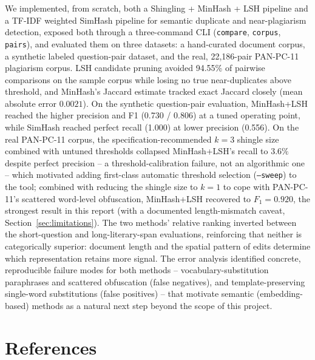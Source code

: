 \documentclass[11pt]{article}
\begin{document}
We implemented, from scratch, both a Shingling + MinHash + LSH pipeline and a TF-IDF weighted SimHash
pipeline for semantic duplicate and near-plagiarism detection, exposed both through a three-command CLI
(\texttt{compare}, \texttt{corpus}, \texttt{pairs}), and evaluated them on three datasets: a hand-curated
document corpus, a synthetic labeled question-pair dataset, and the real, 22{,}186-pair PAN-PC-11
plagiarism corpus. LSH candidate pruning avoided 94.55\% of pairwise comparisons on the sample corpus while
losing no true near-duplicates above threshold, and MinHash's Jaccard estimate tracked exact Jaccard
closely (mean absolute error $0.0021$). On the synthetic question-pair evaluation, MinHash+LSH reached the
higher precision and F1 (0.730 / 0.806) at a tuned operating point, while SimHash reached perfect recall
(1.000) at lower precision (0.556). On the real PAN-PC-11 corpus, the specification-recommended $k=3$
shingle size combined with untuned thresholds collapsed MinHash+LSH's recall to $3.6\%$ despite perfect
precision -- a threshold-calibration failure, not an algorithmic one -- which motivated adding first-class
automatic threshold selection (\texttt{--sweep}) to the tool; combined with reducing the shingle size to
$k=1$ to cope with PAN-PC-11's scattered word-level obfuscation, MinHash+LSH recovered to $F_1=0.920$, the
strongest result in this report (with a documented length-mismatch caveat, Section~\ref{sec:limitations}).
The two methods' relative ranking inverted between the short-question and long-literary-span evaluations,
reinforcing that neither is categorically superior: document length and the spatial pattern of edits
determine which representation retains more signal. The error analysis identified concrete, reproducible
failure modes for both methods -- vocabulary-substitution paraphrases and scattered obfuscation (false
negatives), and template-preserving single-word substitutions (false positives) -- that motivate semantic
(embedding-based) methods as a natural next step beyond the scope of this project.

\section*{References}
\end{document}
